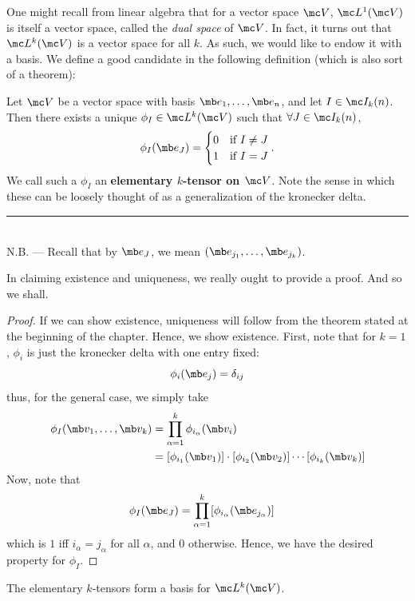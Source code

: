\documentclass{fkbook}
\theoremstyle{snazzydefinition}
\begin{document}
One might recall from linear algebra that for a vector space $\mc V$,
$\mc L^1(\mc V)$ is itself a vector space, called the \emph{dual
  space} of $\mc V$. In fact, it turns out that $\mc L^k(\mc V)$ is a
vector space for all $k$. As such, we would like to endow it with a
basis. We define a good candidate in the following definition (which
is also sort of a theorem):
\begin{definition}
  Let $\mc V$ be a vector space with basis $\mb e_1, \ldots, \mb e_n$,
  and let $I \in \mc I_k(n)$. Then there exists a unique $\phi_I \in
  \mc L^k(\mc V)$ such that $\forall J \in \mc I_k(n)$,
  \[
    \phi_I(\mb e_J) =
    \begin{cases}
      0 & \text{if } I \neq J \\
      1 & \text{if } I = J
    \end{cases}.
  \]
  We call such a $\phi_I$ an \textbf{elementary $k$-tensor on $\mc
    V$}. Note the sense in which these can be loosely thought of as a
  generalization of the kronecker delta. \\
  \rule{0.4\linewidth}{.4pt}\\
  \phantom{h} N.B. --- Recall that by $\mb e_J$, we mean $(\mb
  e_{j_1}, \ldots, \mb e_{j_k})$.
\end{definition}
In claiming existence and uniqueness, we really ought to provide a
proof. And so we shall.
\begin{proof}
  If we can show existence, uniqueness will follow from the theorem
  stated at the beginning of the chapter. Hence, we show existence.
  First, note that for $k = 1$, $\phi_i$ is just the kronecker delta
  with one entry fixed:
  \[
    \phi_i(\mb e_j) = \delta_{ij}
  \]
  thus, for the general case, we simply take
  \begin{align*}
    \phi_I(\mb v_1, \ldots, \mb v_k)
    &= \prod_{\alpha = 1}^k \phi_{i_\alpha}(\mb v_i)  \\
    &= [\phi_{i_1}(\mb v_1)] \cdot [\phi_{i_2}(\mb v_2)] \cdots
      [\phi_{i_k} (\mb v_k)]
  \end{align*}
  Now, note that
  \begin{align*}
    \phi_I(\mb e_J)
    &= \prod_{\alpha=1}^k [\phi_{i_\alpha}(\mb e_{j_\alpha})]
  \end{align*}
  which is $1$ iff $i_{\alpha} = j_{\alpha}$ for all $\alpha$, and 0
  otherwise. Hence, we have the desired property for $\phi_I$.
\end{proof}
\begin{theorem}
  The elementary $k$-tensors form a basis for $\mc L^k(\mc V)$.
\end{theorem}
\end{document}
